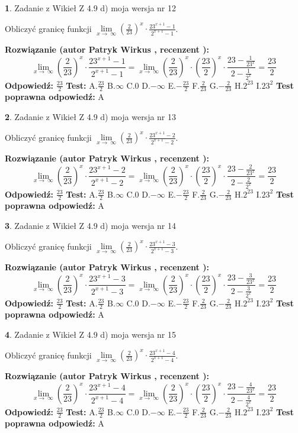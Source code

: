 \documentclass[12pt, a4paper]{article}
\theoremstyle{definition} %
\newtheorem{zad}{}
\newcommand{\zadStart}[1]{\begin{zad}#1\newline}
\newcommand{\zadStop}{\end{zad}}
\newcommand{\rozwStart}[2]{\noindent \textbf{Rozwiązanie (autor #1 , recenzent #2): }\newline}
\newcommand{\rozwStop}{\newline}
\newcommand{\odpStart}{\noindent \textbf{Odpowiedź:}\newline}
\newcommand{\odpStop}{\newline}
\newcommand{\testStart}{\noindent \textbf{Test:}\newline}
\newcommand{\testStop}{\newline}
\newcommand{\kluczStart}{\noindent \textbf{Test poprawna odpowiedź:}\newline}
\newcommand{\kluczStop}{\newline}
\begin{document}
\zadStart{Zadanie z Wikieł Z 4.9 d) moja wersja nr 12}


Obliczyć granicę funkcji  $\lim\limits_{x\to\ \infty}(\frac{2}{23})^{x}\cdot\frac{23^{x+1}-1}{2^{x+1}-1}$.
\zadStop
\rozwStart{Patryk Wirkus}{}
$$\lim\limits_{x\to\ \infty}(\frac{2}{23})^{x}\cdot\frac{23^{x+1}-1}{2^{x+1}-1}=\lim\limits_{x\to\ \infty}(\frac{2}{23})^{x}\cdot(\frac{23}{2})^{x} \cdot \frac{23-\frac{1}{23^{x}}}{2-\frac{1}{2^{x}}} = \frac{23}{2}$$
\rozwStop
\odpStart
$\frac{23}{2}$
\odpStop
\testStart
A.$\frac{23}{2}$ B.$\infty$ C.$0$ D.$-\infty$ E.$-\frac{23}{2}$
F.$\frac{2}{23}$ G.$-\frac{2}{23}$
H.$2^{23}$
I.$23^{2}$
\testStop
\kluczStart
A
\kluczStop



\zadStart{Zadanie z Wikieł Z 4.9 d) moja wersja nr 13}


Obliczyć granicę funkcji  $\lim\limits_{x\to\ \infty}(\frac{2}{23})^{x}\cdot\frac{23^{x+1}-2}{2^{x+1}-2}$.
\zadStop
\rozwStart{Patryk Wirkus}{}
$$\lim\limits_{x\to\ \infty}(\frac{2}{23})^{x}\cdot\frac{23^{x+1}-2}{2^{x+1}-2}=\lim\limits_{x\to\ \infty}(\frac{2}{23})^{x}\cdot(\frac{23}{2})^{x} \cdot \frac{23-\frac{2}{23^{x}}}{2-\frac{2}{2^{x}}} = \frac{23}{2}$$
\rozwStop
\odpStart
$\frac{23}{2}$
\odpStop
\testStart
A.$\frac{23}{2}$ B.$\infty$ C.$0$ D.$-\infty$ E.$-\frac{23}{2}$
F.$\frac{2}{23}$ G.$-\frac{2}{23}$
H.$2^{23}$
I.$23^{2}$
\testStop
\kluczStart
A
\kluczStop



\zadStart{Zadanie z Wikieł Z 4.9 d) moja wersja nr 14}


Obliczyć granicę funkcji  $\lim\limits_{x\to\ \infty}(\frac{2}{23})^{x}\cdot\frac{23^{x+1}-3}{2^{x+1}-3}$.
\zadStop
\rozwStart{Patryk Wirkus}{}
$$\lim\limits_{x\to\ \infty}(\frac{2}{23})^{x}\cdot\frac{23^{x+1}-3}{2^{x+1}-3}=\lim\limits_{x\to\ \infty}(\frac{2}{23})^{x}\cdot(\frac{23}{2})^{x} \cdot \frac{23-\frac{3}{23^{x}}}{2-\frac{3}{2^{x}}} = \frac{23}{2}$$
\rozwStop
\odpStart
$\frac{23}{2}$
\odpStop
\testStart
A.$\frac{23}{2}$ B.$\infty$ C.$0$ D.$-\infty$ E.$-\frac{23}{2}$
F.$\frac{2}{23}$ G.$-\frac{2}{23}$
H.$2^{23}$
I.$23^{2}$
\testStop
\kluczStart
A
\kluczStop



\zadStart{Zadanie z Wikieł Z 4.9 d) moja wersja nr 15}


Obliczyć granicę funkcji  $\lim\limits_{x\to\ \infty}(\frac{2}{23})^{x}\cdot\frac{23^{x+1}-4}{2^{x+1}-4}$.
\zadStop
\rozwStart{Patryk Wirkus}{}
$$\lim\limits_{x\to\ \infty}(\frac{2}{23})^{x}\cdot\frac{23^{x+1}-4}{2^{x+1}-4}=\lim\limits_{x\to\ \infty}(\frac{2}{23})^{x}\cdot(\frac{23}{2})^{x} \cdot \frac{23-\frac{4}{23^{x}}}{2-\frac{4}{2^{x}}} = \frac{23}{2}$$
\rozwStop
\odpStart
$\frac{23}{2}$
\odpStop
\testStart
A.$\frac{23}{2}$ B.$\infty$ C.$0$ D.$-\infty$ E.$-\frac{23}{2}$
F.$\frac{2}{23}$ G.$-\frac{2}{23}$
H.$2^{23}$
I.$23^{2}$
\testStop
\kluczStart
A
\kluczStop
\end{document}
